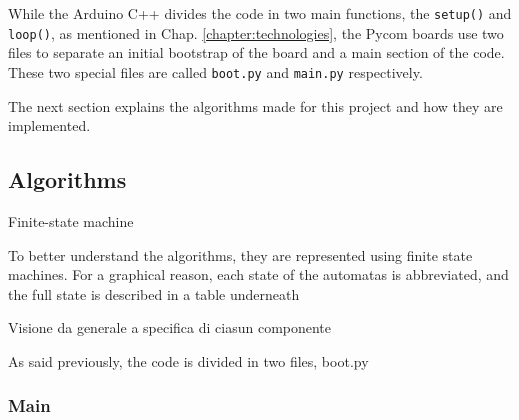 	
	
	
		While the Arduino C++ divides the code in two main functions, the \texttt{setup()} and \texttt{loop()}, as mentioned in Chap. \ref{chapter:technologies}, the Pycom boards use two files to separate an initial bootstrap of the board and a main section of the code.
		These two special files are called \texttt{boot.py} and \texttt{main.py} respectively.
		
		The next section explains the algorithms made for this project and how they are implemented.
		
		\subsection{Algorithms}\label{subsec:algorithms}
	
		
			Finite-state machine
		
			To better understand the algorithms, they are represented using finite state machines.
			For a graphical reason, each state of the automatas is abbreviated, and the full state is described in a table underneath
			
			Visione da generale a specifica di ciasun componente
			
			As said previously, the code is divided in two files, boot.py
			
			\subsubsection{Main}
				
